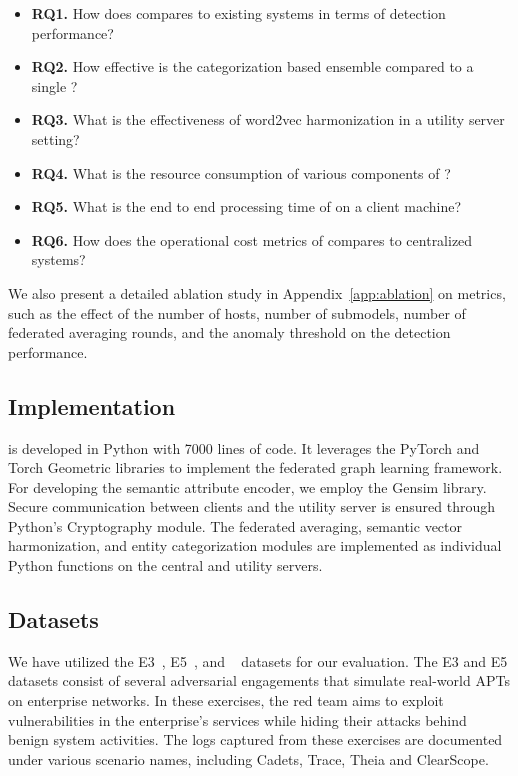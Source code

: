 \begin{itemize}[leftmargin=*]
\item \textbf{RQ1.} How does \Sys compares to existing systems in terms of detection performance?
\item \textbf{RQ2.} How effective is the categorization based \gnnshort ensemble compared to a single \gnnshort? 
\item \textbf{RQ3.} What is the effectiveness of word2vec harmonization in a utility server setting?
\item \textbf{RQ4.} What is the resource consumption of various components of \Sys? 
\item \textbf{RQ5.} What is the end to end processing time of \Sys on a client machine? 
\item \textbf{RQ6.} How does the operational cost metrics of \Sys compares to centralized systems?

\end{itemize}


We also present a detailed ablation study in Appendix~\ref{app:ablation} on metrics, such as the effect of the number of hosts, number of \gnnshort submodels, number of federated averaging rounds, and the anomaly threshold on the detection performance.

\subsection{Implementation}

\Sys is developed in Python with 7000 lines of code. It leverages the PyTorch and Torch Geometric libraries to implement the federated graph learning framework. For developing the semantic attribute encoder, we employ the Gensim library. Secure communication between clients and the utility server is ensured through Python's Cryptography module. The federated averaging, semantic vector harmonization, and entity categorization modules are implemented as individual Python functions on the central and utility servers.


\subsection{Datasets}
We have utilized the \darpa E3~\cite{darpae3}, E5~\cite{darpae5}, and \optc~\cite{darpaoptc} datasets for our evaluation. The E3 and E5 datasets consist of several adversarial engagements that simulate real-world APTs on enterprise networks. In these exercises, the red team aims to exploit vulnerabilities in the enterprise's services while hiding their attacks behind benign system activities. The logs captured from these exercises are documented under various scenario names, including Cadets, Trace, Theia and ClearScope.

